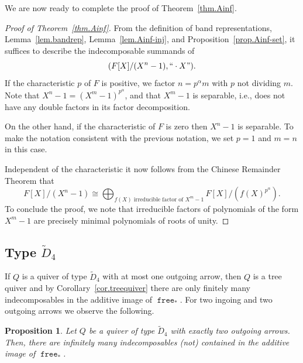 \documentclass[a4paper]{amsart}
\theoremstyle{plain}
\newtheorem{proposition}[theorem]{Proposition}
\theoremstyle{definition}
\theoremstyle{remark}
\newcommand{\funct}[1]{\operatorname{\mathtt{#1}}}
\begin{document}
We are now ready to complete the proof of Theorem~\ref{thm.Ainf}.
\begin{proof}[Proof of Theorem~\ref{thm.Ainf}]
From the definition of band representations, Lemma~\ref{lem.bandrep}, Lemma~\ref{lem.Ainf-inj}, and Proposition~\ref{prop.Ainf-set}, it suffices to describe the indecomposable summands of
\[(F[X] / (X^n-1), ``\cdot X").\]
If the characteristic \( p \) of \( F \) is positive, we factor \( n = p^{\alpha} m \) with \( p \) not dividing \( m \). Note that \( X^n - 1 = (X^m - 1)^{p^{\alpha}} \), and that \( X^m - 1 \) is separable, i.e., does not have any double factors in its factor decomposition.

On the other hand, if the characteristic of \( F \) is zero then \( X^n - 1 \)  is separable. To make the notation consistent with the previous notation, we set \( p = 1 \) and \( m = n \) in this case.

Independent of the characteristic it now follows from the Chinese Remainder Theorem that
\[ F[X] / (X^n-1) \cong \bigoplus_{f(X) \text{ irreducible factor of } X^m-1} F[X]/(f(X)^{p^{\alpha}}). \]
To conclude the proof, we note that irreducible factors of polynomials of the form \( X^m - 1 \) are precisely minimal polynomials of roots of unity. 
\end{proof}

\subsection{Type \texorpdfstring{$\tilde D_4$}{D\_4-tilde}}
\label{subsec.d4}
If $Q$ is a quiver of type $\tilde D_4$ with at most one outgoing arrow, then $Q$ is a tree quiver and by Corollary~\ref{cor.treequiver} there are only finitely many indecomposables in the additive image of $\funct{free}_*$. For two ingoing and two outgoing arrows we observe the following.

\begin{proposition} \label{prop.D4tilde_via_A3tilde}
Let $Q$ be a quiver of type $\tilde D_4$ with exactly two outgoing arrows. Then, there are infinitely many indecomposables (not) contained in the additive image of $\funct{free}_*$. 
\end{proposition}
\end{document}
